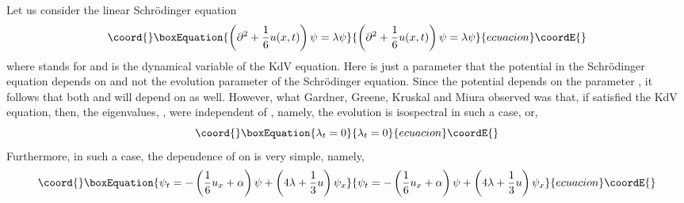 \documentclass[a4paper,11pt]{article}
\begin{document}
Let us consider the linear Schr\"{o}dinger equation
\begin{equation}\coord{}\boxEquation{
\left(\partial^{2} + {1\over 6} u (x,t)\right) \psi = \lambda \psi
}{
\left(\partial^{2} + {1\over 6} u (x,t)\right) \psi = \lambda \psi
}{ecuacion}\coordE{}\end{equation}
where \myHighlight{$\partial$}\coordHE{} stands for \coordHE{} and \coordHE{}
is the dynamical variable of the KdV equation. Here \coordHE{} is just a
parameter that the potential in the Schr\"{o}dinger equation depends
on and not the evolution parameter of the Schr\"{o}dinger
equation. Since the potential \coordHE{} depends on the parameter \coordHE{},
it follows that both \myHighlight{$\psi$}\coordHE{} and \myHighlight{$\lambda$}\coordHE{} will depend on \coordHE{} as
well. However, what Gardner, Greene, Kruskal and Miura observed was
that, if \coordHE{} satisfied the KdV equation, then, the eigenvalues,
\myHighlight{$\lambda$}\coordHE{}, were independent of \coordHE{}, namely, the evolution is
isospectral in such a case, or,
\begin{equation}\coord{}\boxEquation{
\lambda_{t} = 0
}{
\lambda_{t} = 0
}{ecuacion}\coordE{}\end{equation}
Furthermore, in such a case, the dependence of \myHighlight{$\psi$}\coordHE{} on \coordHE{} is very
simple, namely,
\begin{equation}\coord{}\boxEquation{
\psi_{t} = - \left({1\over 6} u_{x} + \alpha\right) \psi +
\left(4\lambda + {1\over 3} u\right) \psi_{x}
}{
\psi_{t} = - \left({1\over 6} u_{x} + \alpha\right) \psi +
\left(4\lambda + {1\over 3} u\right) \psi_{x}
}{ecuacion}\coordE{}\end{equation}
\end{document}
